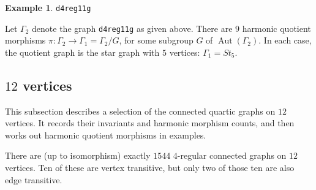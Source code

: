 \documentclass[12pt,letterpaper]{article}
\theoremstyle{definition}
\newtheorem{example}[theorem]{Example}
\DeclareMathOperator{\Aut}{Aut}
\begin{document}
\begin{example}%
\label{example:d4reg11g}
 {\tt d4reg11g}\newline
{\rm  
  Let $\Gamma_2$ denote the graph {\tt d4reg11g} as given above.
There are $9$ harmonic quotient morphisms
$\pi: \Gamma_2\to \Gamma_1=\Gamma_2/G$,
for some subgroup $G$ of $\Aut(\Gamma_2)$. In each case,
the quotient graph is the star graph with $5$ vertices:
$\Gamma_1=St_5$.

}
\end{example}

\subsection{\texorpdfstring{$12$}{12} vertices}
\label{sec:d4reg12}

This subsection describes a selection of the connected quartic graphs on $12$ vertices.
It records their invariants and harmonic morphism counts, and then
works out harmonic quotient morphisms in examples.


There are (up to isomorphism) exactly $1544$ $4$-regular connected graphs on $12$ vertices. Ten of these are vertex transitive, but only two of those ten are also edge transitive. 
\end{document}

